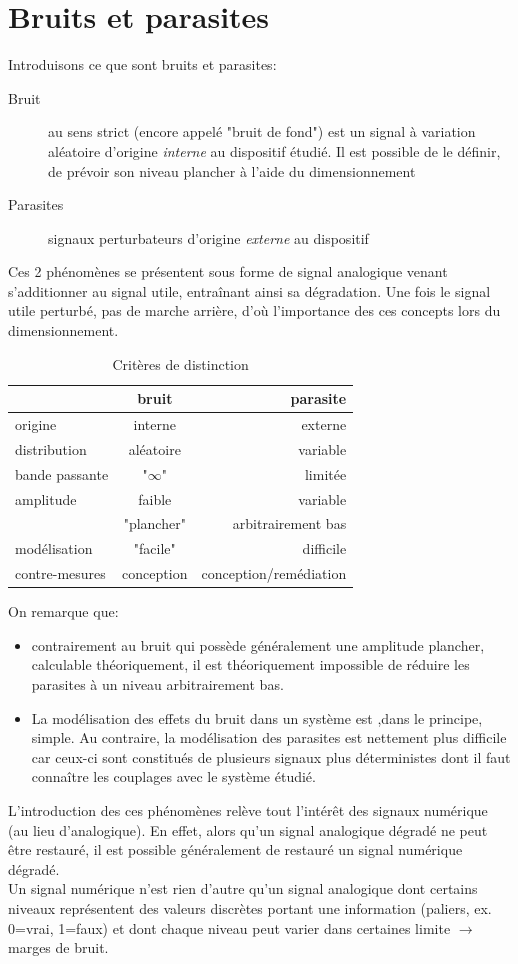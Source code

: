 \chapter{Bruits et parasites}
Introduisons ce que sont bruits et parasites:
\begin{description}
	\item[Bruit] au sens strict (encore appelé "bruit de fond") est un signal à variation aléatoire d'origine \emph{interne} au dispositif étudié. Il est possible de le définir, de prévoir son niveau plancher à l'aide du dimensionnement
	\item[Parasites] signaux perturbateurs d'origine \emph{externe} au dispositif
\end{description}
Ces 2 phénomènes se présentent sous forme de signal analogique venant s'additionner au signal utile, entraînant ainsi sa dégradation. Une fois le signal utile perturbé, pas de marche arrière, d'où l'importance des ces concepts lors du dimensionnement.
\begin{table}[H]
	\centering
	\begin{tabular}{lcr}
		& \textbf{bruit} & \textbf{parasite} \\ \hline
		origine & interne & externe \\
		distribution & aléatoire & variable \\
		bande passante & "\(\infty\)" & limitée \\
		amplitude & faible & variable \\
		& "plancher" & arbitrairement bas \\
		modélisation & "facile" & difficile \\
		contre-mesures & conception & conception/remédiation \\ \hline
 	\end{tabular}
	\caption{Critères de distinction}
\end{table}
On remarque que:
\begin{itemize}
	\item contrairement au bruit qui possède généralement une amplitude plancher, calculable théoriquement, il est théoriquement impossible de réduire les parasites à un niveau arbitrairement bas.
	\item La modélisation des effets du bruit dans un système est ,dans le principe, simple. Au contraire, la modélisation des parasites est nettement plus difficile car ceux-ci sont constitués de plusieurs signaux plus déterministes dont il faut connaître les couplages avec le système étudié.
\end{itemize}
L'introduction des ces phénomènes relève tout l'intérêt des signaux numérique (au lieu d'analogique). En effet, alors qu'un signal analogique dégradé ne peut être restauré, il est possible généralement de restauré un signal numérique dégradé.\\
Un signal numérique n'est rien d'autre qu'un signal analogique dont certains niveaux représentent des valeurs discrètes portant une information (paliers, ex. 0=vrai, 1=faux) et dont chaque niveau peut varier dans certaines limite \(\rightarrow\) marges de bruit.\\

